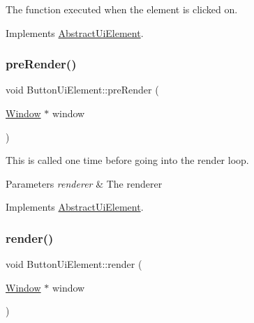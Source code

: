 The function executed when the element is clicked on. 



Implements \mbox{\hyperlink{class_abstract_ui_element_a42296c15c9e70b6ac7fda0b1862612af}{Abstract\+Ui\+Element}}.

\mbox{\label{class_button_ui_element_a035c8beddc1ff6d47b94953025f68422}} 
\subsubsection{\texorpdfstring{pre\+Render()}{preRender()}}
{\footnotesize\ttfamily void Button\+Ui\+Element\+::pre\+Render (\begin{DoxyParamCaption}\item[{\mbox{\hyperlink{class_window}{Window}} $\ast$}]{window }\end{DoxyParamCaption})\hspace{0.3cm}{\ttfamily [virtual]}}

This is called one time before going into the render loop. 


\begin{DoxyParams}{Parameters}
{\em renderer} & The renderer\\
\hline
\end{DoxyParams}


Implements \mbox{\hyperlink{class_abstract_ui_element_a859f627ab385e9d3bf6ce8db40607cdb}{Abstract\+Ui\+Element}}.

\mbox{\label{class_button_ui_element_ad97fc68e9279a36182c66b07dfa28817}} 
\subsubsection{\texorpdfstring{render()}{render()}}
{\footnotesize\ttfamily void Button\+Ui\+Element\+::render (\begin{DoxyParamCaption}\item[{\mbox{\hyperlink{class_window}{Window}} $\ast$}]{window }\end{DoxyParamCaption})\hspace{0.3cm}{\ttfamily [virtual]}}



